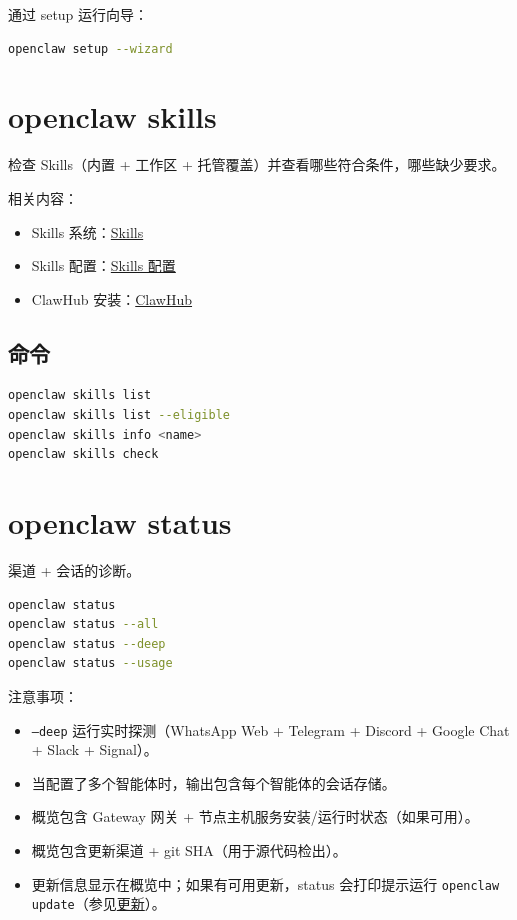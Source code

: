 通过 setup 运行向导：

\begin{lstlisting}[language=bash]
openclaw setup --wizard
\end{lstlisting}



\clearpage

\section{openclaw skills}


检查 Skills（内置 + 工作区 + 托管覆盖）并查看哪些符合条件，哪些缺少要求。

相关内容：

\begin{itemize}
  \item Skills 系统：\href{/tools/skills}{Skills}
  \item Skills 配置：\href{/tools/skills-config}{Skills 配置}
  \item ClawHub 安装：\href{/tools/clawhub}{ClawHub}
\end{itemize}


\subsection{命令}


\begin{lstlisting}[language=bash]
openclaw skills list
openclaw skills list --eligible
openclaw skills info <name>
openclaw skills check
\end{lstlisting}



\clearpage

\section{openclaw status}


渠道 + 会话的诊断。

\begin{lstlisting}[language=bash]
openclaw status
openclaw status --all
openclaw status --deep
openclaw status --usage
\end{lstlisting}


注意事项：

\begin{itemize}
  \item \texttt{--deep} 运行实时探测（WhatsApp Web + Telegram + Discord + Google Chat + Slack + Signal）。
  \item 当配置了多个智能体时，输出包含每个智能体的会话存储。
  \item 概览包含 Gateway 网关 + 节点主机服务安装/运行时状态（如果可用）。
  \item 概览包含更新渠道 + git SHA（用于源代码检出）。
  \item 更新信息显示在概览中；如果有可用更新，status 会打印提示运行 \texttt{openclaw update}（参见\href{/install/updating}{更新}）。
\end{itemize}



